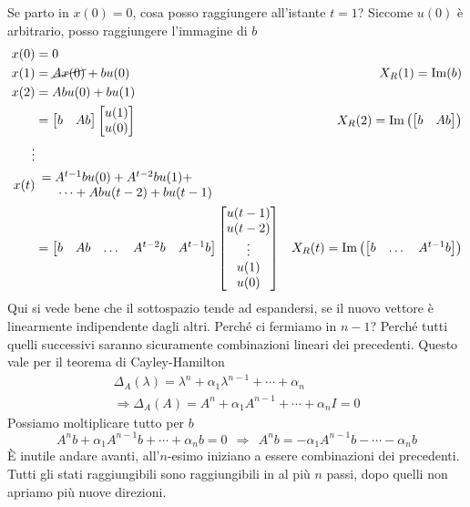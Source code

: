 \documentclass[10pt,a4paper]{book}
\begin{document}
Se parto in $x(0) =0$, cosa posso raggiungere all'istante $t=1$? Siccome $u(0)$ è arbitrario, posso raggiungere l'immagine di $b$
\begin{equation*}
\begin{aligned}
x(0) & =0 & \\
x(1) & =\cancel{Ax(0)} +bu(0) & X_R(1) =\mathrm{Im}(b)\\
x(2) & =Abu(0) +bu(1) & \\
 & =\begin{bmatrix}
b & Ab
\end{bmatrix}\begin{bmatrix}
u(1)\\
u(0)
\end{bmatrix} & X_R(2) =\mathrm{Im}\left(\begin{bmatrix}
b & Ab
\end{bmatrix}\right)\\
\vdots  &  & \\
x(t) &  \begin{array}{l}
=A^{t-1} bu(0) +A^{t-2} bu(1) +\\
\ \ \ \ \cdots +Abu( t-2) +bu( t-1)
\end{array} & \\
 & =\begin{bmatrix}
b & Ab & \dotsc  & A^{t-2} b & A^{t-1} b
\end{bmatrix}\begin{bmatrix}
u( t-1)\\
u( t-2)\\
\vdots \\
u(1)\\
u(0)
\end{bmatrix} & X_R(t) =\mathrm{Im}\left(\begin{bmatrix}
b & \dotsc  & A^{t-1} b
\end{bmatrix}\right)
\end{aligned}
\end{equation*}
Qui si vede bene che il sottospazio tende ad espandersi, se il nuovo vettore è linearmente indipendente dagli altri. Perché ci fermiamo in $n-1$? Perché tutti quelli successivi saranno sicuramente combinazioni lineari dei precedenti. Questo vale per il teorema di Cayley-Hamilton
\begin{gather*}
\Delta _A( \lambda ) =\lambda ^n +\alpha _1 \lambda ^{n-1} +\cdots +\alpha _n\\
\Rightarrow \Delta _A(A) =A^n +\alpha _1 A^{n-1} +\cdots +\alpha _n I=0
\end{gather*}
Possiamo moltiplicare tutto per $b$
\begin{equation*}
A^n b+\alpha _1 A^{n-1} b+\cdots +\alpha _n b=0\ \ \Rightarrow \ \ A^n b=-\alpha _1 A^{n-1} b-\cdots -\alpha _n b
\end{equation*}
È inutile andare avanti, all'$n$-esimo iniziano a essere combinazioni dei precedenti. Tutti gli stati raggiungibili sono raggiungibili in al più $n$ passi, dopo quelli non apriamo più nuove direzioni.
\end{document}
